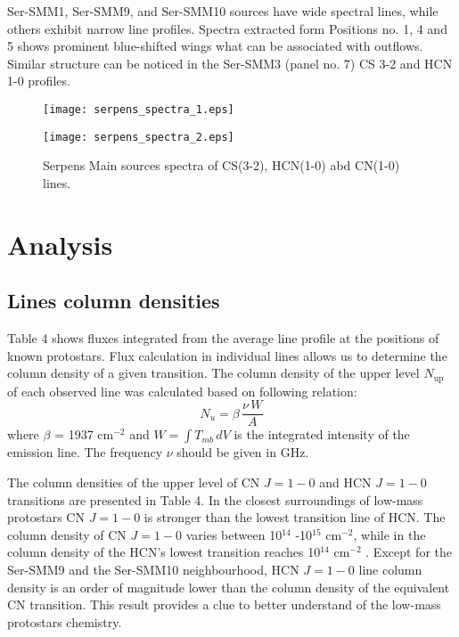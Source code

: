 \documentclass{aa}
\begin{document}
Ser-SMM1, Ser-SMM9, and Ser-SMM10 sources have wide spectral lines, while others exhibit narrow line profiles. Spectra extracted form Positions no. 1, 4 and 5 shows prominent blue-shifted wings what can be associated with outflows. Similar structure can be noticed in the Ser-SMM3 (panel no. 7) CS 3-2 and HCN 1-0 profiles. 


\begin{figure*}
   \centering
   \texttt{[image: serpens\_spectra\_1.eps]}
         \label{Spectra_1}
   \end{figure*}
\begin{figure*}
   \centering
   \texttt{[image: serpens\_spectra\_2.eps]}
      \caption{Serpens Main sources spectra of CS(3-2), HCN(1-0) abd CN(1-0) lines.}
         \label{Spectra_1}
   \end{figure*}

\section{Analysis}

\subsection{Lines column densities}

Table 4 shows fluxes integrated from the average line profile at the positions of known protostars. 
Flux calculation in individual lines allows us to determine the column density of a given transition. The column density of the upper level $N_\mathrm{up}$ of each observed line was calculated based on following relation:
\begin{equation} \label{eq1}
N_u = \beta \, \frac{\nu \, W}{A}
\end{equation}
where $\beta$ = 1937 cm$^{-2}$ and $W = \int{T_{mb} \, dV}$ is the integrated intensity of the emission line. The frequency $\nu$ should be given in GHz.

The column densities of the upper level of CN $J=1-0$ and HCN $J=1-0$ transitions are presented in Table 4. In the closest surroundings of low-mass protostars CN $J=1-0$ is stronger than the lowest transition line of HCN. The column density of CN $J=1-0$ varies between 10$^{14}$ -10$^{15}$ cm$^{-2}$, while in the column density of the HCN’s lowest transition reaches 10$^{14}$ cm$^{-2}$ . Except for the Ser-SMM9 and the Ser-SMM10 neighbourhood, HCN $J=1-0$ line column density is an order of magnitude lower than the column density of the equivalent CN transition. This result provides a clue to better understand of the low-mass protostars chemistry.  
\end{document}
